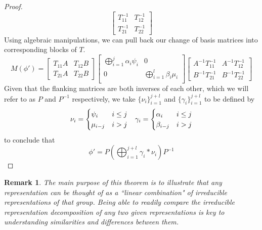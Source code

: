 \documentclass[10pt]{ucthesis}
\newtheorem{remark}[definition]{Remark}
\begin{document}
\begin{proof}
\begin{equation}
\begin{bmatrix}
					T_{11}^{-1} & T_{12}^{-1} \\
					T_{21}^{-1} & T_{22}^{-1}
				\end{bmatrix}
\end{equation}
Using algebraic manipulations, we can pull back our change of basis matrices into corresponding blocks of $T$.
\begin{equation}
	M(\phi') =  \begin{bmatrix}
					T_{11}A & T_{12}B \\
					T_{21}A & T_{22}B
				\end{bmatrix}
				\begin{bmatrix}
					\bigoplus_{i=1}^j \alpha_i\psi_i & 0\\
					0 &  \bigoplus_{i=1}^{l} \beta_i\mu_i \\
				\end{bmatrix}
				\begin{bmatrix}
					A^{-1}T_{11}^{-1} & A^{-1}T_{12}^{-1} \\
					B^{-1}T_{21}^{-1} & B^{-1}T_{22}^{-1}
				\end{bmatrix}
\end{equation}
Given that the flanking matrices are both inverses of each other, which we will refer to as $P$ and $P^{-1}$ respectively, we take $\{\nu_i\}_{i=1}^{j+l}$ and  $\{\gamma_i\}_{i=1}^{j+l}$ to be defined by 
$$\begin{array}{c c}
	\nu_i = \begin{cases}
		\psi_i & i \leq j\\
		\mu_{i-j} & i > j
	\end{cases}
&
	\gamma_i = \begin{cases}
		\alpha_i & i \leq j\\
		\beta_{i-j} & i > j
	\end{cases}
\end{array}$$
to conclude that
\begin{equation}
	\phi' = P\left(\bigoplus_{i=1}^{j+l} \gamma_i*\nu_i\right)P^{-1}
\end{equation} \end{proof}

\begin{remark}
	The main purpose of this theorem is to illustrate that any representation can be thought of as a ``linear combination" of irreducible representations of that group. Being able to readily compare the irreducible representation decomposition of any two given representations is key to understanding similarities and differences between them.
\end{remark}
\end{document}
